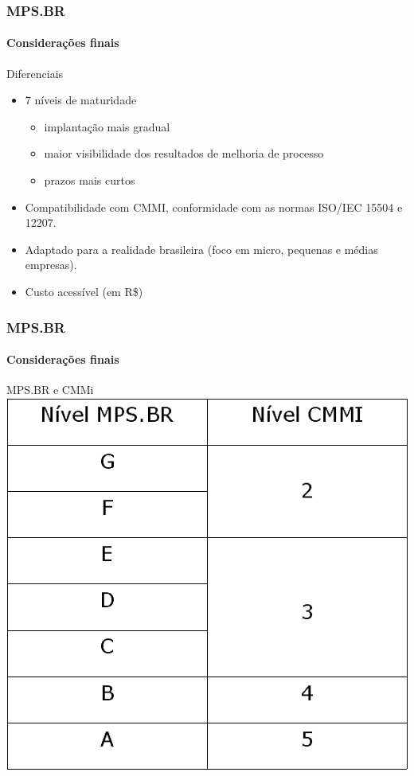 \begin{frame}
	\frametitle{MPS.BR}
	\framesubtitle{Considerações finais}
	
	\begin{block:fact}{Diferenciais}
		\begin{itemize}
			\item 7 níveis de maturidade
			\begin{itemize}
				\item implantação mais gradual
				\item maior visibilidade dos resultados de melhoria de processo
				\item prazos mais curtos
			\end{itemize}
			
			\item Compatibilidade com CMMI, conformidade com as normas ISO/IEC 15504
			e 12207.
			
			\item Adaptado para a realidade brasileira (foco em micro, pequenas e
			médias empresas).
			
			\item Custo acessível (em R\$)
		\end{itemize}
	\end{block:fact}
\end{frame}



\begin{frame}
	\frametitle{MPS.BR}
	\framesubtitle{Considerações finais}
	
	\begin{block:fact}{MPS.BR e CMMi}
		\centering
		\includegraphics[width=.7\textwidth]{software-engineering/project-management/process/process-quality/mpsbr/mpsbr-cmmi}
	\end{block:fact}
\end{frame}